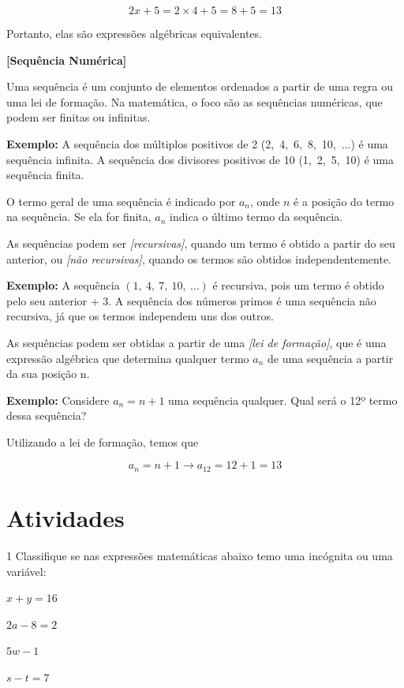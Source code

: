 $$2x + 5 = 2 \times 4 + 5 = 8 + 5 = 13$$ 

Portanto, elas são
expressões algébricas equivalentes.

\textbf{{[}Sequência Numérica{]}}

Uma sequência é um conjunto de elementos ordenados a partir de uma regra
ou uma lei de formação. Na matemática, o foco são as sequências
numéricas, que podem ser finitas ou infinitas.

\textbf{Exemplo:} A sequência dos múltiplos positivos de 2
(2,\ 4,\ 6,\ 8,\ 10,\ ...) é uma sequência infinita. A sequência dos
divisores positivos de 10 (1,\ 2,\ 5,\ 10) é uma sequência finita.

O termo geral de uma sequência é indicado por $a_{n}$, onde $n$  é
a posição do termo na sequência. Se ela for finita, $a_{n}$ indica o
último termo da sequência.

As sequências podem ser \emph{{[}recursivas{]}}, quando um termo é
obtido a partir do seu anterior, ou \emph{{[}não recursivas{]}}, quando
os termos são obtidos independentemente.

\textbf{Exemplo:} A sequência $(1,\ 4,\ 7,\ 10,\ \ldots{})$ é recursiva,
pois um termo é obtido pelo seu anterior + 3. A sequência dos números
primos é uma sequência não recursiva, já que os termos independem uns
dos outros.

As sequências podem ser obtidas a partir de uma \emph{{[}lei de
formação{]}}, que é uma expressão algébrica que determina qualquer termo
$a_{n}$  de uma sequência a partir da sua posição n.

\textbf{Exemplo:} Considere $a_{n} = n + 1$ uma sequência qualquer.
Qual será o 12º termo dessa sequência?

Utilizando a lei de formação, temos que

$$a_{n} = n + 1 \rightarrow a_{12} = 12 + 1 = 13$$

\section{Atividades}

\num{1} Classifique se nas expressões matemáticas abaixo temo uma incógnita
ou uma variável:

\begin{escolha}
\item $x + y = 16$  \\
\item $2a - 8 = 2$  \\
\item $5w - 1$  \\
\item $s - t = 7$ 
\end{escolha}

